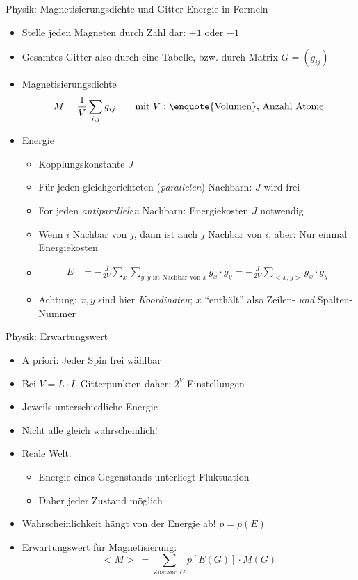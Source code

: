\begin{frame}{Physik: Magnetisierungsdichte und Gitter-Energie in Formeln}
%
\begin{itemize}
\item Stelle jeden Magneten durch Zahl dar: $+1$ oder $-1$
\item Gesamtes Gitter also durch eine Tabelle, bzw. durch Matrix $G = \left( g_{ij} \right)$
\item Magnetisierungsdichte
	\[ M = \frac{1}{V} \sum_{i, j} g_{ij} \qquad \text{mit } V: \text{\enquote{Volumen}, Anzahl Atome} \]
\item Energie
	\begin{itemize}
	\item Kopplungskonstante $J$
	\item Für jeden gleichgerichteten (\emph{parallelen}) Nachbarn: $J$ wird frei
	\item For jeden \emph{antiparallelen} Nachbarn: Energiekosten $J$ notwendig
	\item Wenn $i$ Nachbar von $j$, dann ist auch $j$ Nachbar von $i$, aber: Nur einmal Energiekosten
	\item 
		\begin{align*}
			E &= -\frac{J}{2V} \sum_x \sum_{y: y \text{ ist Nachbar von }x} g_x \cdot g_y 
			  = -\frac{J}{2V} \sum_{<x, y>} g_x \cdot g_y
		\end{align*}			
	\item Achtung: $x, y$ sind hier \emph{Koordinaten}; $x$ \enquote{enthält} also Zeilen- \emph{und} Spalten-Nummer
	\end{itemize}
\end{itemize}
%
\end{frame}


\begin{frame}{Physik: Erwartungswert}
%
\begin{itemize}
\item A priori: Jeder Spin frei wählbar
\item Bei $V = L \cdot L$ Gitterpunkten daher: $2^V$ Einstellungen
\item Jeweils unterschiedliche Energie
\item Nicht alle gleich wahrscheinlich!
\item Reale Welt:
	\begin{itemize}
	\item Energie eines Gegenstands unterliegt Fluktuation
	\item Daher jeder Zustand möglich
	\end{itemize}
\item Wahrscheinlichkeit hängt von der Energie ab! $p = p(E)$
\item Erwartungswert für Magnetisierung:
	\[ <M> ~ = \sum_{\text{Zustand } G} p[E(G)] \cdot M(G) \]
\end{itemize}
%
\end{frame}

